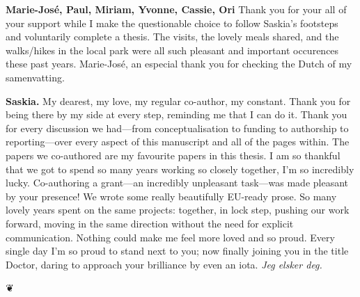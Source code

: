 \textbf{Marie-José, Paul, Miriam, Yvonne, Cassie, Ori} Thank you for your all of your support while I make the questionable choice to follow Saskia's footsteps and voluntarily complete a thesis. The visits, the lovely meals shared, and the walks/hikes in the {\fontRedacted local park} were all such pleasant and important occurences these past years. Marie-José, an especial thank you for checking the Dutch of my samenvatting.

\vfill

\textbf{\color{saskia-blue}Saskia.} My dearest, my love, my regular co-author, my constant. Thank you for being there by my side at every step, reminding me that I can do it. Thank you for every discussion we had---from conceptualisation to funding to authorship to reporting---over every aspect of this manuscript and all of the pages within. The papers we co-authored are my favourite papers in this thesis. I am so thankful that we got to spend so many years working so closely together, I'm so incredibly lucky. Co-authoring a grant---an incredibly unpleasant task---was made pleasant by your presence! We wrote some really beautifully EU-ready prose. So many lovely years spent on the same projects: together, in lock step, pushing our work forward, moving in the same direction without the need for explicit communication. Nothing could make me feel more loved and so proud. Every single day I'm so proud to stand next to you; now finally joining you in the title Doctor, daring to approach your brilliance by even an iota. \textit{Jeg elsker deg.}

\vfill
\begin{center}
{\color{hexy-red}❦}
\end{center}
\vfill
